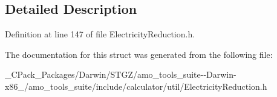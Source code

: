 \subsection{Detailed Description}


Definition at line 147 of file Electricity\+Reduction.\+h.



The documentation for this struct was generated from the following file\+:\begin{DoxyCompactItemize}
\item 
\+\_\+\+C\+Pack\+\_\+\+Packages/\+Darwin/\+S\+T\+G\+Z/amo\+\_\+tools\+\_\+suite-\/-\/\+Darwin-\/x86\+\_/amo\+\_\+tools\+\_\+suite/include/calculator/util/Electricity\+Reduction.\+h\end{DoxyCompactItemize}
